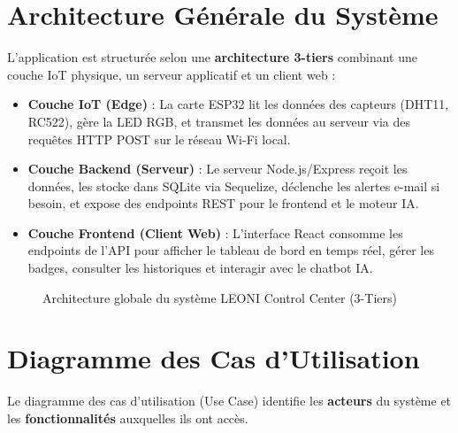 \documentclass[12pt,a4paper]{report}
\begin{document}
\section{Architecture Générale du Système}
L'application est structurée selon une \textbf{architecture 3-tiers} combinant une couche IoT physique, un serveur applicatif et un client web :
\begin{itemize}
    \item \textbf{Couche IoT (Edge)} : La carte ESP32 lit les données des capteurs (DHT11, RC522), gère la LED RGB, et transmet les données au serveur via des requêtes HTTP POST sur le réseau Wi-Fi local.
    \item \textbf{Couche Backend (Serveur)} : Le serveur Node.js/Express reçoit les données, les stocke dans SQLite via Sequelize, déclenche les alertes e-mail si besoin, et expose des endpoints REST pour le frontend et le moteur IA.
    \item \textbf{Couche Frontend (Client Web)} : L'interface React consomme les endpoints de l'API pour afficher le tableau de bord en temps réel, gérer les badges, consulter les historiques et interagir avec le chatbot IA.
\end{itemize}

\begin{figure}[h]
    \centering
    \caption{Architecture globale du système LEONI Control Center (3-Tiers)}
\end{figure}

\section{Diagramme des Cas d'Utilisation}

Le diagramme des cas d'utilisation (Use Case) identifie les \textbf{acteurs} du système et les \textbf{fonctionnalités} auxquelles ils ont accès.
\end{document}
